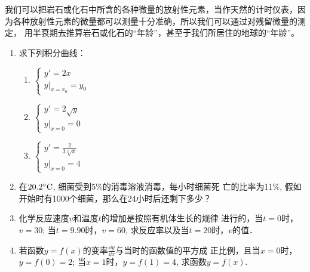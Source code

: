 我们可以把岩石或化石中所含的各种微量的放射性元素，当作天然的计时仪表，因为各种放射性元素的微量都可以测量十分准确，所以我们可以通过对残留微量的测定，
用半衰期去推算岩石或化石的“年龄”，甚至于我们所居住的地球的“年龄”。

\begin{ex}
\begin{enumerate}
    \item 求下列积分曲线：
\begin{multicols}{2}
\begin{enumerate}
    \item $\begin{cases}
        y'=2x\\
        y|_{x=x_0}=y_0
    \end{cases}$
    \item $\begin{cases}
        y'=2\sqrt{y}\\
        y|_{x=0}=0
    \end{cases}$
    \item $\begin{cases}
        y'=\frac{2}{3\sqrt[3]{x}}\\
        y|_{x=0}=4
    \end{cases}$
\end{enumerate}
\end{multicols}
\item 在$20.2^{\circ}{\rm C}$, 细菌受到5\%的消毒溶液消毒，每小时细菌死
    亡的比率为11\%, 假如开始时有1000个细菌，那么在24小时后还剩下多少？
    \item 化学反应速度$v$和温度$t$的增加是按照有机体生长的规律
    进行的，当$t=0$时，$v=30$; 当$t=9.90$时，$v=60$, 求反应率以及当$t=20$时，$v$的值．
\item 若函数$y=f(x)$的变率$\frac{\dd y}{\dd x}$与当时的函数值的平方成
    正比例，且当$x=0$时，$y=f(0)=2$; 当$x=1$时，$y=f(1)=4$, 求函数$y=f(x)$.
\end{enumerate} 
\end{ex}

